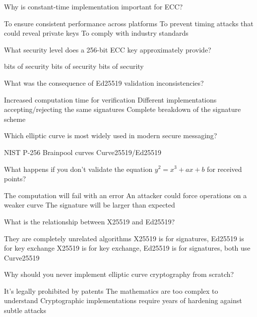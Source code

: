 \documentclass[10pt,a4paper,american]{exam}
\begin{document}
\begin{questions}
	\question Why is constant-time implementation important for ECC?
	\begin{randomizechoices}
		\choice To ensure consistent performance across platforms
		\CorrectChoice To prevent timing attacks that could reveal private keys
		\choice To comply with industry standards
	\end{randomizechoices}

	\question What security level does a 256-bit ECC key approximately provide?
	\begin{randomizechoices}
		 bits of security
		 bits of security
		 bits of security
	\end{randomizechoices}

	\question What was the consequence of Ed25519 validation inconsistencies?
	\begin{randomizechoices}
		\choice Increased computation time for verification
		\CorrectChoice Different implementations accepting/rejecting the same signatures
		\choice Complete breakdown of the signature scheme
	\end{randomizechoices}

	\question Which elliptic curve is most widely used in modern secure messaging?
	\begin{randomizechoices}
		\choice NIST P-256
		\choice Brainpool curves
		\CorrectChoice Curve25519/Ed25519
	\end{randomizechoices}

	\question What happens if you don't validate the equation $y^2 = x^3 + ax + b$ for received points?
	\begin{randomizechoices}
		\choice The computation will fail with an error
		\CorrectChoice An attacker could force operations on a weaker curve
		\choice The signature will be larger than expected
	\end{randomizechoices}

	\question What is the relationship between X25519 and Ed25519?
	\begin{randomizechoices}
		\choice They are completely unrelated algorithms
		\choice X25519 is for signatures, Ed25519 is for key exchange
		\CorrectChoice X25519 is for key exchange, Ed25519 is for signatures, both use Curve25519
	\end{randomizechoices}

	\question Why should you never implement elliptic curve cryptography from scratch?
	\begin{randomizechoices}
		\choice It's legally prohibited by patents
		\choice The mathematics are too complex to understand
		\CorrectChoice Cryptographic implementations require years of hardening against subtle attacks
	\end{randomizechoices}

\end{questions}

\clearpage

\end{document}
